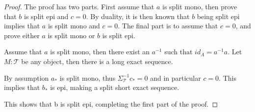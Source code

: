     \begin{proof}
        The proof has two parts. First assume that $a$ is split mono, then prove that $b$ is split epi and $c = 0$. By duality, it is then known that $b$ being split epi implies that $a$ is split mono and $c = 0$. The final part is to assume that $c = 0$, and prove either $a$ is split mono or $b$ is split epi.

        Assume that $a$ is split mono, then there exist an $a^{-1}$ such that $id_A = a^{-1}a$. Let $M:\mathcal{T}$ be any object, then there is a long exact sequence.
        \begin{center}
        \end{center}
        By assumption $a_*$ is split mono, thus $\Sigma_{\mathcal{T}}^{-1}c_* = 0$ and in particular $c = 0$. This implies that $b_*$ is epi, making a split short exact sequence.
        \begin{center}
        \end{center}
        This shows that b is split epi, completing the first part of the proof.


\end{proof}
